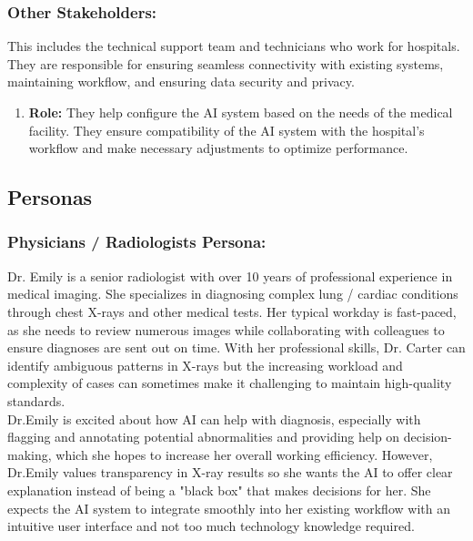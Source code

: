 \documentclass[12pt]{article}
\begin{document}
\subsubsection{Other Stakeholders:}
This includes the technical support team and technicians who work for hospitals. They are responsible for ensuring seamless connectivity with existing systems, maintaining workflow, and ensuring data security and privacy.

\begin{enumerate}
\item \textbf{Role:} They help configure the AI system based on the needs of the medical facility. They ensure compatibility of the AI system with the hospital’s workflow and make necessary adjustments to optimize performance.
\end{enumerate}
\subsection{Personas}
\subsubsection{Physicians / Radiologists Persona:}

Dr. Emily is a senior radiologist with over 10 years of professional experience in medical imaging. She specializes in diagnosing complex lung / cardiac conditions through chest X-rays and other medical tests. Her typical workday is fast-paced, as she needs to review numerous images while collaborating with colleagues to ensure diagnoses are sent out on time. With her professional skills, Dr. Carter can identify ambiguous patterns in X-rays but the increasing workload and complexity of cases can sometimes make it challenging to maintain high-quality standards.\\
\newline
Dr.Emily is excited about how AI can help with diagnosis, especially with flagging and annotating potential abnormalities and providing help on decision-making, which she hopes to increase her overall working efficiency. However, Dr.Emily values transparency in X-ray results so she wants the AI to offer clear explanation instead of being a "black box" that makes decisions for her. She expects the AI system to integrate smoothly into her existing workflow with an intuitive user interface and not too much technology knowledge required. 
\end{document}
